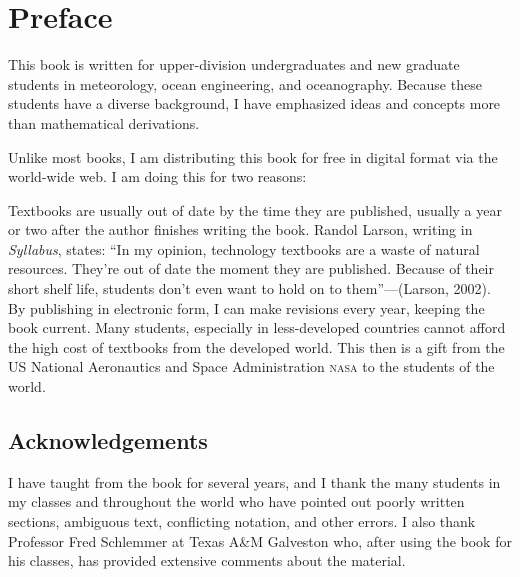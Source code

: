 
\tableofcontents

\chapter{Preface}
This book is written for upper-division undergraduates and new graduate students in meteorology, ocean engineering, and oceanography. Because these students have a diverse background, I have emphasized ideas and concepts more than mathematical derivations.

Unlike most books, I am distributing this book for free in digital format via the world-wide web. I am doing this for two reasons:
\begin{enumerate}
\vitem
Textbooks are usually out of date by the time they are published, usually a year or two after the author finishes writing the book. Randol Larson, writing in \textit{Syllabus}, states: ``In my opinion, technology textbooks are a waste of natural resources. They're out of date the moment they are published. Because of their short shelf life, students don't even want to hold on to them''---(Larson, 2002). By publishing in electronic form, I can make revisions every year, keeping the book current.
\vitem
Many students, especially in less-developed countries cannot afford the high cost of textbooks from the developed world. This then is a gift from the US National Aeronautics and Space Administration \textsc{nasa} to the students of the world.
\end{enumerate} 

\section*{Acknowledgements}
I have taught from the book for several years, and I thank the many students in my classes and throughout the world who have pointed out poorly written sections, ambiguous text, conflicting notation, and other errors.  I also thank Professor Fred Schlemmer at Texas A\&M Galveston who, after using the book for his classes, has provided extensive comments about the material.

